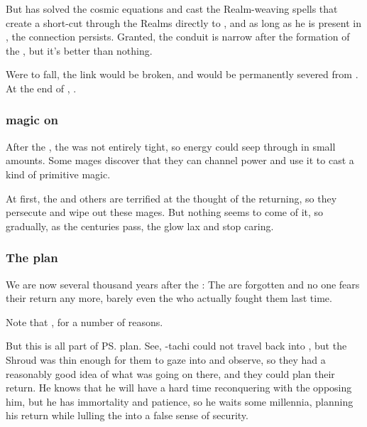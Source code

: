 But \Daggerrain{} has solved the cosmic equations and cast the Realm-weaving spells that create a short-cut through the Realms directly to \Erebos, and as long as he is present in \Nyx, the connection persists.
Granted, the conduit is narrow after the formation of the , but it's better than nothing. 

Were \Daggerrain{} to fall, the link would be broken, and \Nyx{} would be permanently severed from \Erebos. At the end of \SentinelsFinalBook, . 





\subsubsection{\Bane{} magic on \Miith}
After the \firstbanewar, the \CrystalSphere{} was not entirely tight, so \Erebean{} energy could seep through in small amounts. Some mages discover that they can channel \bane{} power and use it to cast a kind of primitive \nieur{} magic. 

At first, the \dragons{} and others are terrified at the thought of the \banes{} returning, so they persecute and wipe out these mages. But nothing seems to come of it, so gradually, as the centuries pass, the \dragons{} glow lax and stop caring. 





\subsubsection{The \banesz{} plan}
We are now several thousand years after the \firstbanewar: The \banes{} are forgotten and no one fears their return any more, barely even the \dragons{} who actually fought them last time. 

Note that , for a number of reasons. 

But this is all part of \ps{\Daggerrain}{} plan. See, \Daggerrain-tachi could not travel back into \Miith{}, but the Shroud was thin enough for them to gaze into \Miith{} and observe, so they had a reasonably good idea of what was going on there, and they could plan their return. He knows that he will have a hard time reconquering \Miith{} with the \dragons{} opposing him, but he has immortality and patience, so he waits some millennia, planning his return while lulling the \dragons{} into a false sense of security. 

